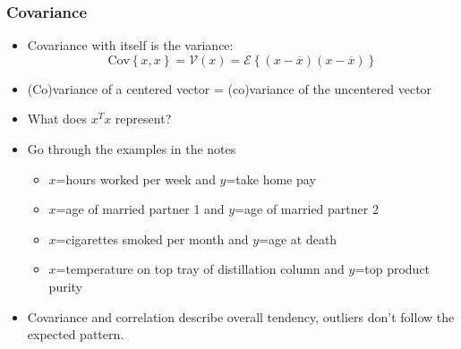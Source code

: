 \begin{frame}\frametitle{Covariance}
	\begin{itemize}
		\item	Covariance with itself is the variance: 
		$$\text{Cov}\left\{x, x\right\} = \mathcal{V}(x) = \mathcal{E}\left\{ (x - \overline{x}) (x - \overline{x})\right\}$$
		
		\item	(Co)variance of a centered vector = (co)variance of the uncentered vector 
		\item	What does $x^Tx$ represent? 
	\end{itemize}
	\begin{itemize}
		\item	Go through the examples in the notes 
		\begin{itemize}
			\item	$x$=hours worked per week and $y$=take home pay 
			\item	$x$=age of married partner 1 and $y$=age of married partner 2 
			\item	$x$=cigarettes smoked per month and $y$=age at death 
			\item	$x$=temperature on top tray of distillation column and $y$=top product purity 
		\end{itemize}
	\end{itemize}
	\begin{itemize}
		\item	Covariance and correlation describe overall tendency, outliers don't follow the expected pattern. 
	\end{itemize}
\end{frame}

